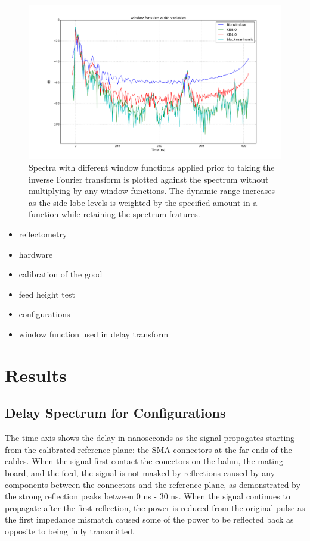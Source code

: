 \documentclass[preprint]{aastex}  %
\begin{document}
\begin{figure}[H]
	\begin{center}
	\includegraphics[width =.8\textwidth]{./reflectometry_plots/window_variation}
	\caption{Spectra with different window functions applied prior to taking the inverse Fourier 
transform is plotted against the spectrum without multiplying by any window functions. The 
dynamic range increases as the side-lobe levels is weighted by the specified amount in a 
function while retaining the spectrum features.
\label{Fig:windowwidth}}
	\end{center}
\end{figure}
\clearpage

\begin{itemize}
\item reflectometry 
\item hardware 
\item calibration of the good
\item feed height test
\item configurations
\item window function used in delay transform
\end{itemize}

\section{Results}
\label{sec:results}
\subsection{Delay Spectrum for Configurations}
 The time axis shows the delay in nanoseconds as the signal propagates starting 
 from the calibrated reference plane: the SMA connectors at the far ends of the cables. When the 
signal first contact the conectors on the balun, the mating board, and the feed, the signal is not 
masked by reflections caused by any components between the connectors and the reference 
plane, as demonstrated by the strong reflection peaks between $0$ ns - $30$ ns. When the signal continues to propagate after the first reflection, the power is reduced from the 
original pulse as the first impedance mismatch caused some of the power to be reflected back
as opposite to being fully transmitted.  
\end{document}
